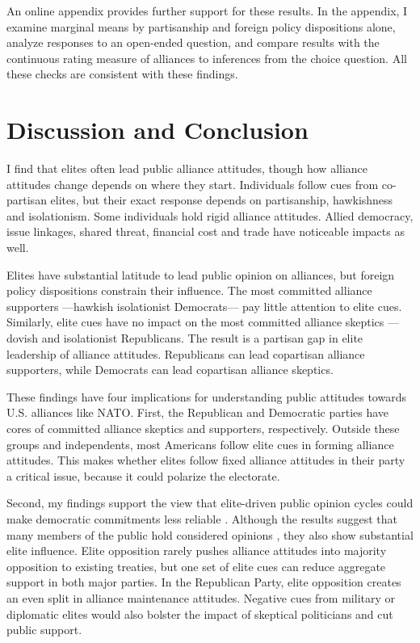 \documentclass[12pt]{article}
\begin{document}
An online appendix provides further support for these results. 
In the appendix, I examine marginal means by partisanship and foreign policy dispositions alone, analyze responses to an open-ended question, and compare results with the continuous rating measure of alliances to inferences from the choice question.
All these checks are consistent with these findings. 


\section{Discussion and Conclusion} 


I find that elites often lead public alliance attitudes, though how alliance attitudes change depends on where they start.  
Individuals follow cues from co-partisan elites, but their exact response depends on partisanship, hawkishness and isolationism. 
Some individuals hold rigid alliance attitudes. 
Allied democracy, issue linkages, shared threat, financial cost and trade have noticeable impacts as well.  


Elites have substantial latitude to lead public opinion on alliances, but foreign policy dispositions constrain their influence. 
The most committed alliance supporters ---hawkish isolationist Democrats--- pay little attention to elite cues.
Similarly, elite cues have no impact on the most committed alliance skeptics --- dovish and isolationist Republicans. 
The result is a partisan gap in elite leadership of alliance attitudes. 
Republicans can lead copartisan alliance supporters, while Democrats can lead copartisan alliance skeptics. 


These findings have four implications for understanding public attitudes towards U.S. alliances like NATO. 
First, the Republican and Democratic parties have cores of committed alliance skeptics and supporters, respectively.
Outside these groups and independents, most Americans follow elite cues in forming alliance attitudes. 
This makes whether elites follow fixed alliance attitudes in their party a critical issue, because it could polarize the electorate.  


Second, my findings support the view that elite-driven public opinion cycles could make democratic commitments less reliable \citep{GartzkeGleditsch2004}. 
Although the results suggest that many members of the public hold considered opinions \citep{PageShapiro1992}, they also show substantial elite influence. 
Elite opposition rarely pushes alliance attitudes into majority opposition to existing treaties, but one set of elite cues can reduce aggregate support in both major parties.
In the Republican Party, elite opposition creates an even split in alliance maintenance attitudes. 
Negative cues from military or diplomatic elites would also bolster the impact of skeptical politicians and cut public support. 
\end{document}
